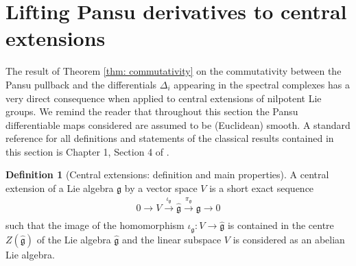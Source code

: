 \documentclass[dvipsnames]{amsart}
\theoremstyle{definition}
\newtheorem{definition}[theorem]{Definition}
\theoremstyle{definition}
\numberwithin{equation}{section}
\begin{document}
\section{Lifting Pansu derivatives to central extensions}\label{section application}

The result of Theorem \ref{thm: commutativity} on the commutativity between the Pansu pullback and the differentials $\Delta_i$ appearing in the spectral complexes has a very direct consequence when applied to central extensions of nilpotent Lie groups. We remind the reader that throughout this section the Pansu differentiable maps considered are assumed to be (Euclidean) smooth. A standard reference for all definitions and statements of the classical results contained in this section is Chapter 1, Section 4 of \cite{FUKS}.

\begin{definition}[Central extensions: definition and main properties]\label{def: central ext}
    A central extension of a Lie algebra $\mathfrak{g}$ by a vector space $V$ is a short exact sequence
    \begin{align*}
        0\longrightarrow V\xrightarrow[]{\iota_\mathfrak{g}}\hat{\mathfrak{g}}\xrightarrow[]{\pi_\mathfrak{g}}\mathfrak{g}\longrightarrow 0
    \end{align*}
    such that the image of the homomorphism $\iota_\mathfrak{g}\colon V\longrightarrow\hat{\mathfrak{g}}$ is contained in the centre $Z(\hat{\mathfrak{g}})$ of the Lie algebra $\hat{\mathfrak{g}}$ and the linear subspace $V$ is considered as an abelian Lie algebra.


\end{definition}
\end{document}
